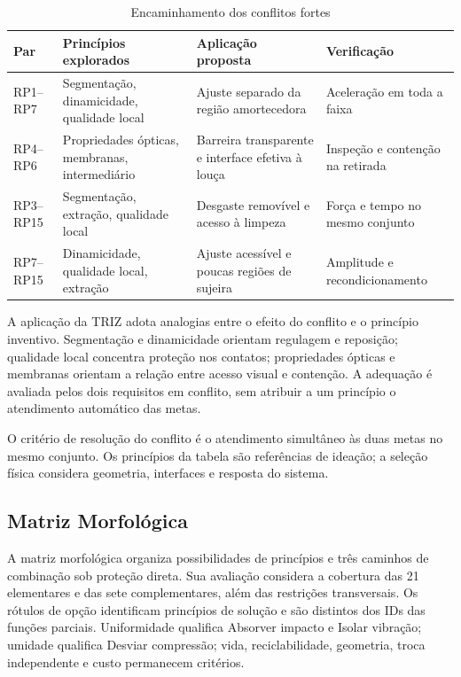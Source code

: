\begin{table}[H]
\caption{Encaminhamento dos conflitos fortes}\centering\scriptsize
\begin{tabularx}{\textwidth}{L{1.9cm}L{4.4cm}YY}
\toprule\textbf{Par}&\textbf{Princípios explorados}&\textbf{Aplicação proposta}&\textbf{Verificação}\\\midrule
RP1--RP7&Segmentação, dinamicidade, qualidade local&Ajuste separado da região amortecedora&Aceleração em toda a faixa\\
RP4--RP6&Propriedades ópticas, membranas, intermediário&Barreira transparente e interface efetiva à louça&Inspeção e contenção na retirada\\
RP3--RP15&Segmentação, extração, qualidade local&Desgaste removível e acesso à limpeza&Força e tempo no mesmo conjunto\\
RP7--RP15&Dinamicidade, qualidade local, extração&Ajuste acessível e poucas regiões de sujeira&Amplitude e recondicionamento\\
\bottomrule\end{tabularx}
\end{table}

A aplicação da TRIZ adota analogias entre o efeito do conflito e o princípio inventivo. Segmentação e dinamicidade orientam regulagem e reposição; qualidade local concentra proteção nos contatos; propriedades ópticas e membranas orientam a relação entre acesso visual e contenção. A adequação é avaliada pelos dois requisitos em conflito, sem atribuir a um princípio o atendimento automático das metas.

O critério de resolução do conflito é o atendimento simultâneo às duas metas no mesmo conjunto. Os princípios da tabela são referências de ideação; a seleção física considera geometria, interfaces e resposta do sistema.

\subsection{Matriz Morfológica}

A matriz morfológica organiza possibilidades de princípios e três caminhos de combinação sob proteção direta. Sua avaliação considera a cobertura das 21 elementares e das sete complementares, além das restrições transversais. Os rótulos de opção identificam princípios de solução e são distintos dos IDs das funções parciais. Uniformidade qualifica Absorver impacto e Isolar vibração; umidade qualifica Desviar compressão; vida, reciclabilidade, geometria, troca independente e custo permanecem critérios.

